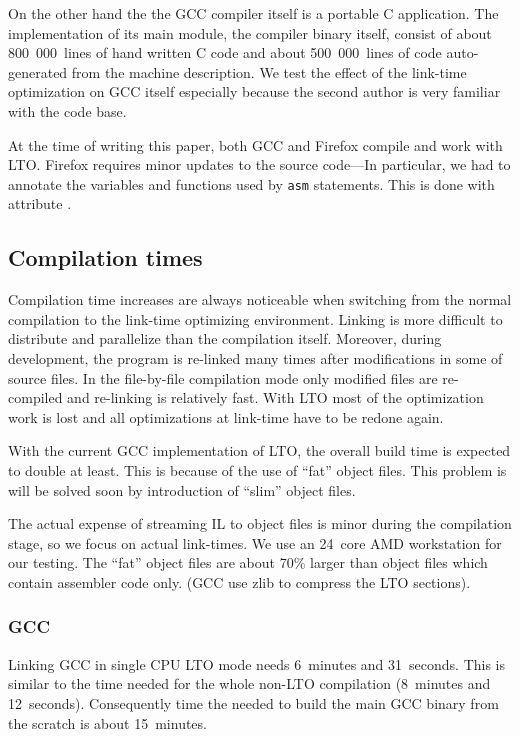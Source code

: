 \documentclass[final]{ols}
\begin{document}
On the other hand the the GCC compiler itself is a portable C application.
The implementation of its main module, the compiler binary itself, consist of about
800~000~lines of hand written C code and about 500~000~lines of code
auto-generated from the machine description. We test the effect of the link-time
optimization on GCC itself especially because the second author is very
familiar with the code base. 

At the time of writing this paper, both GCC and Firefox compile and work with
LTO.  Firefox requires minor updates to the source code---In particular, we had
to annotate the variables and functions used by {\tt asm} statements.  This is
done with attribute  \cite{GCCmanual}.

\subsection{Compilation times}

Compilation time increases are always noticeable when switching from the normal
compilation to the link-time optimizing environment.  Linking is more difficult to
distribute and parallelize than the compilation itself. Moreover, during
development, the program is re-linked many times after modifications in some of
source files.  In the file-by-file compilation mode only modified files are re-compiled
and re-linking is relatively fast.  With LTO most of the optimization work is lost and
all optimizations at link-time have to be redone again.

With the current GCC implementation of LTO, the overall build time is expected to
double at least. This is because of the use of ``fat'' object files.  This
problem is will be solved soon by introduction of ``slim'' object files.

The actual expense of streaming IL to object files is minor during the compilation stage, so we
focus on actual link-times. We use an 24~core AMD workstation for our testing.
The ``fat'' object files are about 70\% larger than object files which contain assembler
code only. (GCC use zlib to compress the LTO sections).

\subsubsection{GCC}

Linking GCC in single CPU LTO mode needs 6~minutes and 31~seconds. This is similar to the time
needed for the whole non-LTO compilation (8~minutes and 12~seconds). Consequently
time the needed to build the main GCC binary from the scratch is about 15~minutes.
\end{document}
